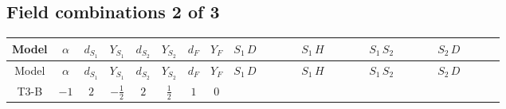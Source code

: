\documentclass[8pt]{article}
\begin{document}
\begin{landscape}
\subsection*{Field combinations 2 of 3}
\begin{longtable}{@{}cccccccc >{\raggedright\arraybackslash}p{0.18\linewidth} >{\raggedright\arraybackslash}p{0.18\linewidth} >{\raggedright\arraybackslash}p{0.18\linewidth} >{\raggedright\arraybackslash}p{0.18\linewidth}@{}}
\toprule
Model & $\alpha$ & $d_{S_1}$ & $Y_{S_1}$ & $d_{S_2}$ & $Y_{S_2}$ & $d_F$ & $Y_F$ & $S_1\,D$ & $S_1\,H$ & $S_1\,S_2$ & $S_2\,D$ \\
\midrule
\endfirsthead
\toprule
Model & $\alpha$ & $d_{S_1}$ & $Y_{S_1}$ & $d_{S_2}$ & $Y_{S_2}$ & $d_F$ & $Y_F$ & $S_1\,D$ & $S_1\,H$ & $S_1\,S_2$ & $S_2\,D$ \\
\midrule
\endhead
T3-B & $-1$ & $2$ & $-\frac{1}{2}$ & $2$ & $\frac{1}{2}$ & $1$ & $0$ & \scriptsize\adjustbox{max width=\linewidth}{$\begin{gathered} +D_{\mu _1}\left(\text{NewScalar1}_{a_1}\right){}^{\dagger } D_{\mu _1}\left(\text{NewScalar1}_{a_1}\right)\end{gathered}$} & \scriptsize\adjustbox{max width=\linewidth}{$\begin{gathered} +\text{lambdaH1Inv1} H_{a_3} \text{NewScalar1}_{a_4} \text{T3HiggsPortal1CGInv1}_{a_1,a_3,a_2,a_4} H_{a_1}{}^{\dagger } \text{NewScalar1}_{a_2}{}^{\dagger } \\ +\text{lambdaH1Inv2} H_{a_3} \text{NewScalar1}_{a_4} \text{T3HiggsPortal1CGInv2}_{a_1,a_3,a_2,a_4} H_{a_1}{}^{\dagger } \text{NewScalar1}_{a_2}{}^{\dagger }\end{gathered}$} & \scriptsize\adjustbox{max width=\linewidth}{$\begin{gathered} +\text{lambda12Inv1} \text{NewScalar1}_{a_3} \text{NewScalar2}_{a_4} \text{T3CrossScalarCGInv1}_{a_1,a_3,a_2,a_4} \text{NewScalar1}_{a_1}{}^{\dagger } \text{NewScalar2}_{a_2}{}^{\dagger } \\ +\text{lambda12Inv2} \text{NewScalar1}_{a_3} \text{NewScalar2}_{a_4} \text{T3CrossScalarCGInv2}_{a_1,a_3,a_2,a_4} \text{NewScalar1}_{a_1}{}^{\dagger } \text{NewScalar2}_{a_2}{}^{\dagger }\end{gathered}$} & \scriptsize\adjustbox{max width=\linewidth}{$\begin{gathered} +D_{\mu _1}\left(\text{NewScalar2}_{a_1}\right){}^{\dagger } D_{\mu _1}\left(\text{NewScalar2}_{a_1}\right)\end{gathered}$} \\

\end{longtable}
\end{landscape}
\end{document}
